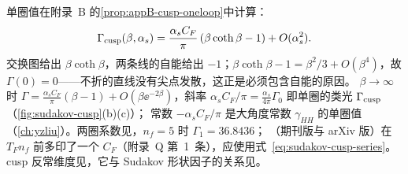 单圈值在附录~B 的\cref{prop:appB-cusp-oneloop}中计算：
\begin{equation}\label{eq:sudakov-cusp-1loop}
\Gamma_{\rm cusp}(\beta,\alpha_s)=\frac{\alpha_sC_F}{\pi}\,(\beta\coth\beta-1)+O(\alpha_s^2).
\end{equation}
交换图给出 $\beta\coth\beta$，两条线的自能给出 $-1$；$\beta\coth\beta-1=\beta^2/3+O(\beta^4)$，故 $\Gamma(0)=0$——不折的直线没有尖点发散，这正是必须包含自能的原因。
$\beta\to\infty$ 时 $\Gamma=\frac{\alpha_sC_F}\pi(\beta-1)+O(\beta\ee^{-2\beta})$，斜率 $\alpha_sC_F/\pi=\frac{\alpha_s}{4\pi}\Gamma_0$ 即单圈的类光 $\Gamma_{\rm cusp}$（\cref{fig:sudakov-cusp}(b)(c)）；
常数 $-\alpha_sC_F/\pi$ 是大角度常数 $\gamma_{HH}$ 的单圈值（\cref{ch:yzliu}）。两圈系数见\cite{KorchemskyRadyushkin1987}，$n_f=5$ 时 $\Gamma_1=36.8436$；
\cite[式~(A.10)]{BecherSchwartz2008}（期刊版与 arXiv 版）在 $T_Fn_f$ 前多印了一个 $C_F$（附录~Q 第~1~条），应使用式~\eqref{eq:sudakov-cusp-series}。
cusp 反常维度见\cite{Polyakov1980,BrandtNeriSato1981,KorchemskyRadyushkin1987}，它与 Sudakov 形状因子的关系见\cite{Korchemsky1989}。

